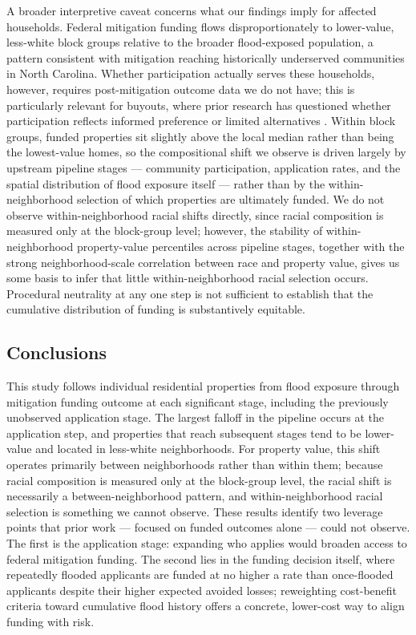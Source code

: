 \documentclass[
  authoryear,
  preprint]{elsarticle}
\begin{document}
A broader interpretive caveat concerns what our findings imply for
affected households. Federal mitigation funding flows disproportionately
to lower-value, less-white block groups relative to the broader
flood-exposed population, a pattern consistent with mitigation reaching
historically underserved communities in North Carolina. Whether
participation actually serves these households, however, requires
post-mitigation outcome data we do not have; this is particularly
relevant for buyouts, where prior research has questioned whether
participation reflects informed preference or limited alternatives
\citep{machManagedRetreatVoluntary2019}. Within block groups, funded
properties sit slightly above the local median rather than being the
lowest-value homes, so the compositional shift we observe is driven
largely by upstream pipeline stages --- community participation,
application rates, and the spatial distribution of flood exposure itself
--- rather than by the within-neighborhood selection of which properties
are ultimately funded. We do not observe within-neighborhood racial
shifts directly, since racial composition is measured only at the
block-group level; however, the stability of within-neighborhood
property-value percentiles across pipeline stages, together with the
strong neighborhood-scale correlation between race and property value,
gives us some basis to infer that little within-neighborhood racial
selection occurs. Procedural neutrality at any one step is not
sufficient to establish that the cumulative distribution of funding is
substantively equitable.

\subsection{Conclusions}\label{conclusions}

This study follows individual residential properties from flood exposure
through mitigation funding outcome at each significant stage, including
the previously unobserved application stage. The largest falloff in the
pipeline occurs at the application step, and properties that reach
subsequent stages tend to be lower-value and located in less-white
neighborhoods. For property value, this shift operates primarily between
neighborhoods rather than within them; because racial composition is
measured only at the block-group level, the racial shift is necessarily
a between-neighborhood pattern, and within-neighborhood racial selection
is something we cannot observe. These results identify two leverage
points that prior work --- focused on funded outcomes alone --- could
not observe. The first is the application stage: expanding who applies
would broaden access to federal mitigation funding. The second lies in
the funding decision itself, where repeatedly flooded applicants are
funded at no higher a rate than once-flooded applicants despite their
higher expected avoided losses; reweighting cost-benefit criteria toward
cumulative flood history offers a concrete, lower-cost way to align
funding with risk.
\end{document}
